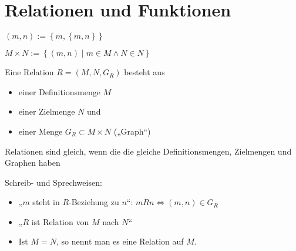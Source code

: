 \section{Relationen und Funktionen}
\begin{definition}
  $(m, n) := \left\{ m, \left\{ m, n \right\} \right\}$
\end{definition}
\begin{definition}
  $M \times N := \left\{ (m, n) \middle| m \in M \wedge N \in N \right\}$\index[sym]{$\times$}
\end{definition}
\begin{definition}
  Eine Relation $R = (M, N, G_R)$ besteht aus
  \begin{itemize}
  \item einer Definitionsmenge $M$
  \item einer Zielmenge $N$ und
  \item einer Menge $G_R \subset M \times N$ („Graph“)
  \end{itemize}

  Relationen sind gleich, wenn die die gleiche Definitionsmengen, Zielmengen und Graphen haben
  
  Schreib- und Sprechweisen:
  \begin{itemize}
  \item „$m$ steht in $R$-Beziehung zu $n$“: $mRn \iff (m, n) \in G_R$
  \item „$R$ ist Relation von $M$ nach $N$“
  \item Ist $M=N$, so nennt man es eine Relation auf $M$.
  \end{itemize}
\end{definition}

